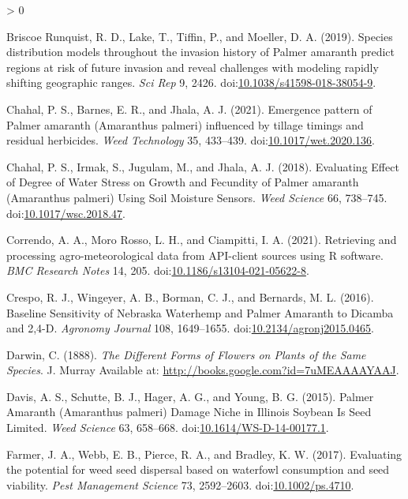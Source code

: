 \documentclass[utf8]{frontiersSCNS}
\newlength{\cslhangindent}
\newenvironment{CSLReferences}[2] %
 {%
  \setlength{\parindent}{0pt}
  \ifodd #1 \everypar{\setlength{\hangindent}{\cslhangindent}}\ignorespaces\fi
  \ifnum #2 > 0
  \setlength{\parskip}{#2\baselineskip}
  \fi
 }%
 {}
\begin{document}
\begin{CSLReferences}{1}{0}
\leavevmode\hypertarget{ref-briscoerunquist2019}{}%
Briscoe Runquist, R. D., Lake, T., Tiffin, P., and Moeller, D. A.
(2019). Species distribution models throughout the invasion history of
{Palmer} amaranth predict regions at risk of future invasion and reveal
challenges with modeling rapidly shifting geographic ranges. \emph{Sci
Rep} 9, 2426.
doi:\href{https://doi.org/10.1038/s41598-018-38054-9}{10.1038/s41598-018-38054-9}.

\leavevmode\hypertarget{ref-chahal2021}{}%
Chahal, P. S., Barnes, E. R., and Jhala, A. J. (2021). Emergence pattern
of {Palmer} amaranth ({Amaranthus} palmeri) influenced by tillage
timings and residual herbicides. \emph{Weed Technology} 35, 433--439.
doi:\href{https://doi.org/10.1017/wet.2020.136}{10.1017/wet.2020.136}.

\leavevmode\hypertarget{ref-chahal2018}{}%
Chahal, P. S., Irmak, S., Jugulam, M., and Jhala, A. J. (2018).
Evaluating {Effect} of {Degree} of {Water Stress} on {Growth} and
{Fecundity} of {Palmer} amaranth ({Amaranthus} palmeri) {Using Soil
Moisture Sensors}. \emph{Weed Science} 66, 738--745.
doi:\href{https://doi.org/10.1017/wsc.2018.47}{10.1017/wsc.2018.47}.

\leavevmode\hypertarget{ref-correndo2021}{}%
Correndo, A. A., Moro Rosso, L. H., and Ciampitti, I. A. (2021).
Retrieving and processing agro-meteorological data from {API}-client
sources using {R} software. \emph{BMC Research Notes} 14, 205.
doi:\href{https://doi.org/10.1186/s13104-021-05622-8}{10.1186/s13104-021-05622-8}.

\leavevmode\hypertarget{ref-crespo2016a}{}%
Crespo, R. J., Wingeyer, A. B., Borman, C. J., and Bernards, M. L.
(2016). Baseline {Sensitivity} of {Nebraska Waterhemp} and {Palmer
Amaranth} to {Dicamba} and 2,4-{D}. \emph{Agronomy Journal} 108,
1649--1655.
doi:\href{https://doi.org/10.2134/agronj2015.0465}{10.2134/agronj2015.0465}.

\leavevmode\hypertarget{ref-darwin1888}{}%
Darwin, C. (1888). \emph{The {Different Forms} of {Flowers} on {Plants}
of the {Same Species}}. {J. Murray} Available at:
\url{http://books.google.com?id=7uMEAAAAYAAJ}.

\leavevmode\hypertarget{ref-davis2015}{}%
Davis, A. S., Schutte, B. J., Hager, A. G., and Young, B. G. (2015).
Palmer {Amaranth} ({Amaranthus} palmeri) {Damage Niche} in {Illinois
Soybean Is Seed Limited}. \emph{Weed Science} 63, 658--668.
doi:\href{https://doi.org/10.1614/WS-D-14-00177.1}{10.1614/WS-D-14-00177.1}.

\leavevmode\hypertarget{ref-farmer2017}{}%
Farmer, J. A., Webb, E. B., Pierce, R. A., and Bradley, K. W. (2017).
Evaluating the potential for weed seed dispersal based on waterfowl
consumption and seed viability. \emph{Pest Management Science} 73,
2592--2603. doi:\href{https://doi.org/10.1002/ps.4710}{10.1002/ps.4710}.


\end{CSLReferences}
\end{document}
